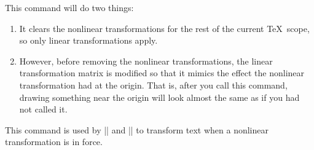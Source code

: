 \begin{command}{\pgfapproximatenonlineartransformation}
  This command will do two things:
  \begin{enumerate}
  \item It clears the nonlinear transformations for the rest of the
    current \TeX\ scope, so only linear transformations apply.
  \item However, before removing the nonlinear transformations, the
    linear transformation matrix is modified so that it mimics the
    effect the nonlinear transformation had at the origin. That is,
    after you call this command, drawing something near the origin
    will look almost the same as if you had not called it.
  \end{enumerate}

\begin{codeexample}[]
\end{codeexample}
  This command is used by |\pgftext| and |\pgfnode| to transform text
  when a nonlinear transformation is in force.
\end{command}

